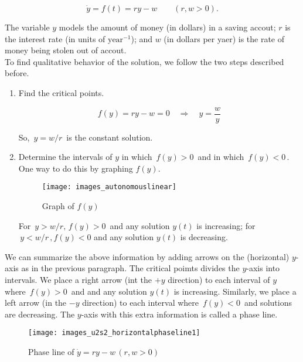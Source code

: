\begin{equation*}
  \dot y = f(t) = ry - w \qquad (r, w > 0). 
\end{equation*}

The variable $y$ models the amount of money (in dollars) in a saving accout;
$r$ is the interest rate (in units of $\text{year}^{-1}$); and $w$ (in dollars per yaer)
is the rate of money being stolen out of accout. \\
To find qualitative behavior of the solution, we follow the two steps described before.

\begin{enumerate}
\item Find the critical points.

  \begin{equation*}
    f(y) = ry - w = 0 \quad \Rightarrow \quad y = \frac{w}{y}
  \end{equation*}

  So, $\, y = w/r\, $ is the constant solution.

\item Determine the intervals of $y$ in which $\, f(y) > 0 \,$ and in which $\, f(y) < 0 \,$.
  One way to do this by graphing $f(y)$.

  \begin{figure}[ht!]
    \centering
    \texttt{[image: images\_autonomouslinear]}
    \caption{Graph of $f(y)$}
  \end{figure}

  For $\, y > w/r,\, f(y) > 0\,$ and any solution $y(t)$ is increasing;
  for $\, y < w/r\, , f(y) < 0 $ and any solution $y(t)$ is decreasing. \\
  
\end{enumerate}

We can summarize the above information by adding arrows on the (horizontal)
$y$-axis as in the previous paragraph. The critical poimts divides the $y$-axis
into intervals.
We place a right arrow (int the $+y$ direction) to each interval of $y$ where
$\, f(y) > 0 \,$ and and any solution $y(t)$ is increasing.
Similarly, we place a left arrow (in the $−y$ direction) to each interval
where $\, f(y)<0 \,$ and solutions are decreasing.
The $y$-axis with this extra information is called a phase line.

\begin{figure}[ht!]
  \centering
  \texttt{[image: images\_u2s2\_horizontalphaseline1]}
  \caption{Phase line of $\dot y = ry - w\, (r,w > 0)$}
\end{figure}

